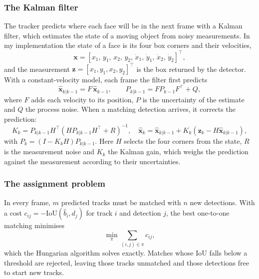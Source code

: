 \subsubsection{The Kalman filter}

The tracker predicts where each face will be in the next frame with a Kalman filter, which
estimates the state of a moving object from noisy measurements. In my implementation the
state of a face is its four box corners and their velocities,
\begin{equation}
  \mathbf{x} = [x_1,\, y_1,\, x_2,\, y_2,\, \dot{x}_1,\, \dot{y}_1,\, \dot{x}_2,\, \dot{y}_2]^{\top},
\end{equation}
and the measurement $\mathbf{z} = [x_1, y_1, x_2, y_2]^{\top}$ is the box returned by the
detector. With a constant-velocity model, each frame the filter first predicts
\begin{equation}
  \hat{\mathbf{x}}_{k|k-1} = F\,\hat{\mathbf{x}}_{k-1}, \qquad
  P_{k|k-1} = F P_{k-1} F^{\top} + Q,
  \label{eq:kf_predict}
\end{equation}
where $F$ adds each velocity to its position, $P$ is the uncertainty of the estimate and
$Q$ the process noise. When a matching detection arrives, it corrects the prediction:
\begin{equation}
  K_k = P_{k|k-1} H^{\top}\left(H P_{k|k-1} H^{\top} + R\right)^{-1}, \quad
  \hat{\mathbf{x}}_k = \hat{\mathbf{x}}_{k|k-1} + K_k\left(\mathbf{z}_k - H\hat{\mathbf{x}}_{k|k-1}\right),
  \label{eq:kf_update}
\end{equation}
with $P_k = (I - K_k H) P_{k|k-1}$. Here $H$ selects the four corners from the state, $R$
is the measurement noise and $K_k$ the Kalman gain, which weighs the prediction against
the measurement according to their uncertainties.

\subsubsection{The assignment problem}

In every frame, $m$ predicted tracks must be matched with $n$ new detections. With a cost
$c_{ij} = -\mathrm{IoU}(\hat{b}_i, d_j)$ for track $i$ and detection $j$, the best
one-to-one matching minimises
\begin{equation}
  \min_{\pi} \sum_{(i,j) \in \pi} c_{ij},
  \label{eq:assign}
\end{equation}
which the Hungarian algorithm solves exactly. Matches whose IoU falls below a threshold
are rejected, leaving those tracks unmatched and those detections free to start new
tracks.

